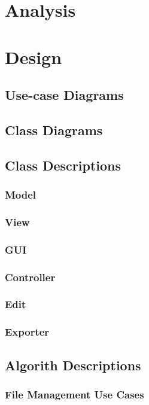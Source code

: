 \documentclass[a4paper]{article}
\begin{document}

\newpage
\tableofcontents 
\newpage

\section{Analysis}
	
\section{Design}
	\subsection{Use-case Diagrams}
	\subsection{Class Diagrams}
	\subsection{Class Descriptions}
		\subsubsection{Model}
		\subsubsection{View}
		\subsubsection{GUI}
		\subsubsection{Controller}
		\subsubsection{Edit}
		\subsubsection{Exporter}
	\subsection{Algorith Descriptions}
		\subsubsection{File Management Use Cases}
\end{document}
